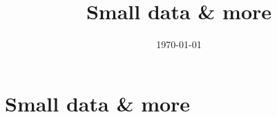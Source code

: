 \documentclass[11pt]{report}
\title{Small data \& more}
\author{}
\date{\today}
\theoremstyle{plain}
\theoremstyle{definition}
\begin{document}
\maketitle

\chapter{Small data \& more}




\end{document}
